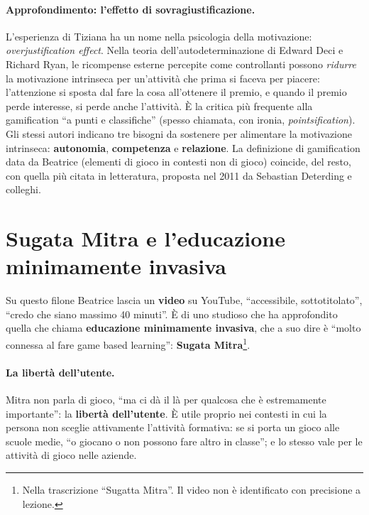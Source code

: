 \paragraph{Approfondimento: l'effetto di sovragiustificazione.} L'esperienza di
Tiziana ha un nome nella psicologia della motivazione: \emph{overjustification
effect}. Nella teoria dell'autodeterminazione di Edward Deci e Richard Ryan, le
ricompense esterne percepite come controllanti possono \emph{ridurre} la motivazione
intrinseca per un'attività che prima si faceva per piacere: l'attenzione si sposta
dal fare la cosa all'ottenere il premio, e quando il premio perde interesse, si perde
anche l'attività. È la critica più frequente alla gamification ``a punti e
classifiche'' (spesso chiamata, con ironia, \emph{pointsification}). Gli stessi
autori indicano tre bisogni da sostenere per alimentare la motivazione intrinseca:
\textbf{autonomia}, \textbf{competenza} e \textbf{relazione}. La definizione di
gamification data da Beatrice (elementi di gioco in contesti non di gioco) coincide,
del resto, con quella più citata in letteratura, proposta nel 2011 da Sebastian
Deterding e colleghi.

\section{Sugata Mitra e l'educazione minimamente invasiva}
\label{a9:sec:mitra}



Su questo filone Beatrice lascia un \textbf{video} su YouTube, ``accessibile,
sottotitolato'', ``credo che siano massimo 40 minuti''. È di uno studioso che ha
approfondito quella che chiama \textbf{educazione minimamente invasiva}, che a suo
dire è ``molto connessa al fare game based learning'': \textbf{Sugata
Mitra}\footnote{Nella trascrizione ``Sugatta Mitra''. Il video non è identificato con
precisione a lezione.}.

\paragraph{La libertà dell'utente.} Mitra non parla di gioco, ``ma ci dà il là per
qualcosa che è estremamente importante'': la \textbf{libertà dell'utente}. È utile
proprio nei contesti in cui la persona non sceglie attivamente l'attività formativa:
se si porta un gioco alle scuole medie, ``o giocano o non possono fare altro in
classe''; e lo stesso vale per le attività di gioco nelle aziende.

